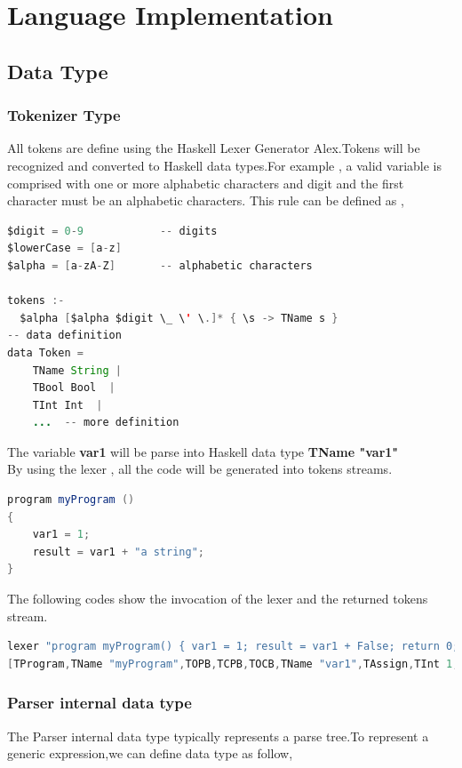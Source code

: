 \chapter{Language Implementation}


\section{Data Type}
\subsection{Tokenizer Type}
All tokens are define using the Haskell Lexer Generator Alex.Tokens will be recognized and converted to Haskell data types.For example , a valid variable is comprised with one or more alphabetic characters and digit and the first character must be an alphabetic characters. This rule can be defined as ,
\begin{lstlisting}[language=java]
$digit = 0-9			-- digits
$lowerCase = [a-z]
$alpha = [a-zA-Z]		-- alphabetic characters

tokens :-
  $alpha [$alpha $digit \_ \' \.]* { \s -> TName s }
-- data definition
data Token = 
	TName String |
	TBool Bool  | 
	TInt Int  | 
	...  -- more definition			

\end{lstlisting}

The variable \textbf{var1} will be parse into Haskell data type \textbf{TName "var1"}\\


By using the lexer , all the code will be generated into tokens streams.
\begin{lstlisting}[language=java]
program myProgram ()
{
	var1 = 1;
	result = var1 + "a string";
}
\end{lstlisting}

The following codes show the invocation of the lexer and the returned tokens stream.
\begin{lstlisting}[language=java]
lexer "program myProgram() { var1 = 1; result = var1 + False; return 0; }"
[TProgram,TName "myProgram",TOPB,TCPB,TOCB,TName "var1",TAssign,TInt 1,TSC,TName "result",TAssign,TName "var1",TPlus,TBool False,TSC,TReturn,TInt 0,TSC,TCCB]
\end{lstlisting}



\subsection{Parser internal data type}
The Parser internal data type typically represents a parse tree.To represent a generic expression,we can define data type as follow,

